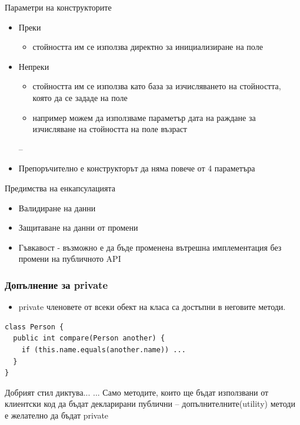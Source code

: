\documentclass{beamer}
\begin{document}
\begin{frame}{Параметри на конструкторите}
  \transdissolve
  \begin{itemize}
  \item Преки
    \begin{itemize}
    \item стойността им се
      използва директно за инициализиране
      на поле
    \end{itemize}
  \item Непреки
    \begin{itemize}
    \item стойността им се
      използва като база за изчисляването на
      стойността, която да се зададе на поле
    \item например можем да използваме параметър дата на раждане за
      изчисляване на стойността на поле възраст
    \end{itemize}– 
  \item Препоръчително е конструкторът да няма повече от 4 параметъра
  \end{itemize}
\end{frame}

\begin{frame}{Предимства на енкапсулацията}
  \transdissolve
  \begin{itemize}
  \item Валидиране на данни \pause
  \item Защитаване на данни от промени \pause
  \item Гъвкавост - възможно е да бъде
    променена вътрешна имплементация
    без промени на публичното API
  \end{itemize}
\end{frame}

\begin{frame}[fragile]
  \frametitle{Допълнение за private}
  \transdissolve
  \begin{itemize}
  \item private членовете от всеки обект на
    класа са достъпни в неговите методи.
  \end{itemize}
\begin{lstlisting}
class Person {
  public int compare(Person another) {
    if (this.name.equals(another.name)) ...
  }
}
\end{lstlisting}
\end{frame}

\begin{frame}{Добрият стил диктува...}
  \transdissolve
  ... Само методите, които ще бъдат
  използвани от клиентски код да бъдат
  декларирани публични –
  допълнителните(utility) методи е
  желателно да бъдат private
\end{frame}
\end{document}
